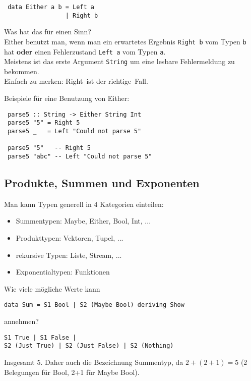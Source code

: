 \documentclass{beamer}
\begin{document}
\begin{frame}[fragile]
 \begin{verbatim}
 data Either a b = Left a
                 | Right b
 \end{verbatim}
 \pause
 Was hat das für einen Sinn?\\
 \pause
 Either benutzt man, wenn man ein erwartetes Ergebnis \texttt{Right b} vom Typen \texttt{b} hat \textbf{oder} einen Fehlerzustand \texttt{Left a} vom Typen \texttt{a}.\\
 Meistens ist das erste Argument \texttt{String} um eine lesbare Fehlermeldung zu bekommen.\\
 \pause
 \bigskip
 Einfach zu merken: \glqq Right\grqq \ ist der \glqq richtige\grqq \ Fall.
\end{frame}

\begin{frame}[fragile]
 Beispiele für eine Benutzung von Either:
 \begin{verbatim}
 parse5 :: String -> Either String Int
 parse5 "5" = Right 5
 parse5 _   = Left "Could not parse 5"
 
 parse5 "5"   -- Right 5
 parse5 "abc" -- Left "Could not parse 5"
 \end{verbatim}
\end{frame}

\subsection{Produkte, Summen und Exponenten}
\begin{frame}[fragile]
Man kann Typen generell in 4 Kategorien einteilen:
\pause
\begin{itemize}
 \item Summentypen: Maybe, Either, Bool, Int, ...
 \item Produkttypen: Vektoren, Tupel, ...
 \item rekursive Typen: Liste, Stream, ...
 \item Exponentialtypen: Funktionen
\end{itemize}
\end{frame}

\begin{frame}[fragile]
Wie viele mögliche Werte kann
\begin{verbatim}
data Sum = S1 Bool | S2 (Maybe Bool) deriving Show
\end{verbatim}
annehmen?
\pause
\begin{verbatim}
S1 True | S1 False |
S2 (Just True) | S2 (Just False) | S2 (Nothing)
\end{verbatim}
Insgesamt 5. Daher auch die Bezeichnung Summentyp, da $2+(2+1) = 5$ (2 Belegungen für Bool, 2+1 für Maybe Bool).
\end{frame}
\end{document}
